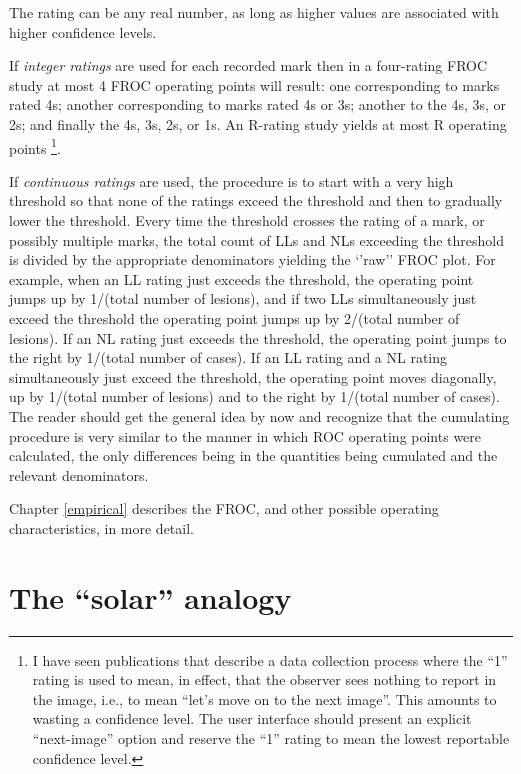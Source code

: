 \documentclass[
]{book}
\begin{document}
The rating can be any real number, as long as higher values are associated with higher confidence levels.

If \emph{integer ratings} are used for each recorded mark then in a four-rating FROC study at most 4 FROC operating points will result: one corresponding to marks rated 4s; another corresponding to marks rated 4s or 3s; another to the 4s, 3s, or 2s; and finally the 4s, 3s, 2s, or 1s. An R-rating study yields at most R operating points \footnote{I have seen publications that describe a data collection process where the ``1'' rating is used to mean, in effect, that the observer sees nothing to report in the image, i.e., to mean ``let's move on to the next image''. This amounts to wasting a confidence level. The user interface should present an explicit ``next-image'' option and reserve the ``1'' rating to mean the lowest reportable confidence level.}.

If \emph{continuous ratings} are used, the procedure is to start with a very high threshold so that none of the ratings exceed the threshold and then to gradually lower the threshold. Every time the threshold crosses the rating of a mark, or possibly multiple marks, the total count of LLs and NLs exceeding the threshold is divided by the appropriate denominators yielding the `'raw'' FROC plot. For example, when an LL rating just exceeds the threshold, the operating point jumps up by 1/(total number of lesions), and if two LLs simultaneously just exceed the threshold the operating point jumps up by 2/(total number of lesions). If an NL rating just exceeds the threshold, the operating point jumps to the right by 1/(total number of cases). If an LL rating and a NL rating simultaneously just exceed the threshold, the operating point moves diagonally, up by 1/(total number of lesions) and to the right by 1/(total number of cases). The reader should get the general idea by now and recognize that the cumulating procedure is very similar to the manner in which ROC operating points were calculated, the only differences being in the quantities being cumulated and the relevant denominators.

Chapter \ref{empirical} describes the FROC, and other possible operating characteristics, in more detail.

\hypertarget{froc-paradigm-solar-analogy}{%
\section{The ``solar'' analogy}\label{froc-paradigm-solar-analogy}}
\end{document}
